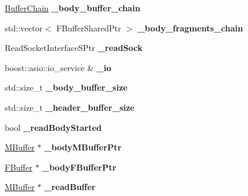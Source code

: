\begin{DoxyCompactItemize}
\item 
\mbox{\label{class_message_reader_a6e6d5c1c4ab54e7313c68742d0a8d4a7}} 
\hyperlink{class_buffer_chain}{Buffer\+Chain} {\bfseries \+\_\+body\+\_\+buffer\+\_\+chain}
\item 
\mbox{\label{class_message_reader_aa678e062266320bfb530386be56b9c38}} 
std\+::vector$<$ F\+Buffer\+Shared\+Ptr $>$ {\bfseries \+\_\+body\+\_\+fragments\+\_\+chain}
\item 
\mbox{\label{class_message_reader_a8c59f3b342647abae8ad4693082fcc31}} 
Read\+Socket\+Interface\+S\+Ptr {\bfseries \+\_\+read\+Sock}
\item 
\mbox{\label{class_message_reader_af95447697277c9ef993844b57c643591}} 
boost\+::asio\+::io\+\_\+service \& {\bfseries \+\_\+io}
\item 
\mbox{\label{class_message_reader_a12621c4803e1dff5d27e237ead132e08}} 
std\+::size\+\_\+t {\bfseries \+\_\+body\+\_\+buffer\+\_\+size}
\item 
\mbox{\label{class_message_reader_a6c2b39003410b82a8fb1fc8807c68bad}} 
std\+::size\+\_\+t {\bfseries \+\_\+header\+\_\+buffer\+\_\+size}
\item 
\mbox{\label{class_message_reader_aa566ebe170a434558fa281037c7535d0}} 
bool {\bfseries \+\_\+read\+Body\+Started}
\item 
\mbox{\label{class_message_reader_a39dc9d4c6c5b16c73a55f1f89ed22b16}} 
\hyperlink{struct_m_buffer}{M\+Buffer} $\ast$ {\bfseries \+\_\+body\+M\+Buffer\+Ptr}
\item 
\mbox{\label{class_message_reader_a5e48aeb6d413b756ae8a6a84d830e25d}} 
\hyperlink{class_f_buffer}{F\+Buffer} $\ast$ {\bfseries \+\_\+body\+F\+Buffer\+Ptr}
\item 
\mbox{\label{class_message_reader_a2ce5dc510e084fa7dc3cc94d5d699277}} 
\hyperlink{struct_m_buffer}{M\+Buffer} $\ast$ {\bfseries \+\_\+read\+Buffer}
\item 

\end{DoxyCompactItemize}
